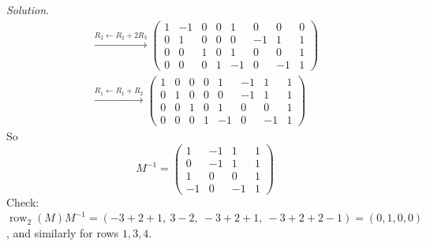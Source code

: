 \documentclass[12pt]{article}
\DeclareMathOperator{\row}{row}
\theoremstyle{definition}
\newenvironment{solution}{\par\noindent\textit{Solution.}\ }{\par\smallskip}
\begin{document}
\begin{solution}
\[\begin{gathered}
\xrightarrow{R_2\leftarrow R_2+2R_3}
\left(\begin{array}{cccc|cccc}1&-1&0&0&1&0&0&0\\0&1&0&0&0&-1&1&1\\0&0&1&0&1&0&0&1\\0&0&0&1&-1&0&-1&1\end{array}\right)
\\
\xrightarrow{R_1\leftarrow R_1+R_2}
\left(\begin{array}{cccc|cccc}1&0&0&0&1&-1&1&1\\0&1&0&0&0&-1&1&1\\0&0&1&0&1&0&0&1\\0&0&0&1&-1&0&-1&1\end{array}\right)
\end{gathered}
\]
So
\[
M^{-1}=\begin{pmatrix}1&-1&1&1\\0&-1&1&1\\1&0&0&1\\-1&0&-1&1\end{pmatrix}
\]
Check: \(\row_2(M)M^{-1}=(-3+2+1,\ 3-2,\ -3+2+1,\ -3+2+2-1)=(0,1,0,0)\), and similarly for rows \(1,3,4\).


\end{solution}
\end{document}
